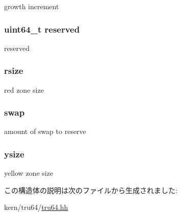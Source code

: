 growth increment \hypertarget{structTru64_1_1vm__stack_ac35c1fbebe2017fc1ca10f5803668dfd}{
\subsubsection[{reserved}]{\setlength{\rightskip}{0pt plus 5cm}uint64\_\-t {\bf reserved}}}
\label{structTru64_1_1vm__stack_ac35c1fbebe2017fc1ca10f5803668dfd}


reserved \hypertarget{structTru64_1_1vm__stack_aa915f6b06d95b6c4842464eb624a044e}{
\subsubsection[{rsize}]{ {\bf rsize}}}
\label{structTru64_1_1vm__stack_aa915f6b06d95b6c4842464eb624a044e}


red zone size \hypertarget{structTru64_1_1vm__stack_abb8ba4eaf2e820b8b06fcf18f3c95bd3}{
\subsubsection[{swap}]{ {\bf swap}}}
\label{structTru64_1_1vm__stack_abb8ba4eaf2e820b8b06fcf18f3c95bd3}


amount of swap to reserve \hypertarget{structTru64_1_1vm__stack_aef0bffca6586c3e1489aba142b0a6771}{
\subsubsection[{ysize}]{ {\bf ysize}}}
\label{structTru64_1_1vm__stack_aef0bffca6586c3e1489aba142b0a6771}


yellow zone size 

この構造体の説明は次のファイルから生成されました:\begin{DoxyCompactItemize}
\item 
kern/tru64/\hyperlink{kern_2tru64_2tru64_8hh}{tru64.hh}\end{DoxyCompactItemize}
